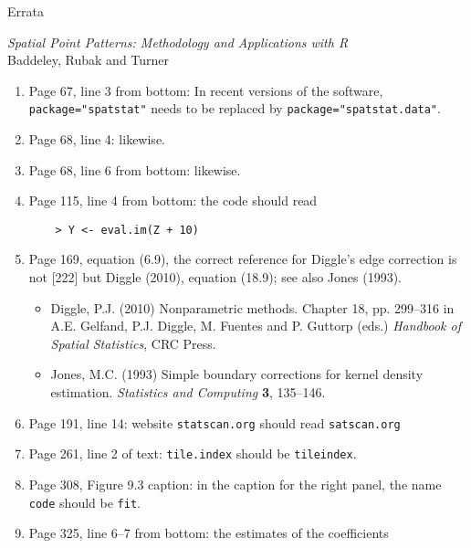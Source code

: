 \documentclass[12pt,a4paper]{article}
\begin{document}
\thispagestyle{empty}
\begin{center}
  \begin{LARGE}
    Errata 
  \end{LARGE}

  \begin{large}
    \emph{Spatial Point Patterns: Methodology and Applications with R}\\
    Baddeley, Rubak and Turner
  \end{large}
\end{center}

\begin{enumerate}
\item Page 67, line 3 from bottom: In recent versions of the software,
  \texttt{package="spatstat"} needs to be replaced by
  \texttt{package="spatstat.data"}.
\item Page 68, line 4: likewise.
\item Page 68, line 6 from bottom: likewise.
\item Page 115, line 4 from bottom: the code should read
\begin{verbatim}
    > Y <- eval.im(Z + 10)
\end{verbatim}
\item Page 169, equation (6.9), the correct reference for Diggle's
edge correction is not [222] %
but Diggle (2010), equation (18.9); see also Jones (1993).
\begin{small}
  \begin{itemize}
  \item
    Diggle, P.J. (2010)
    Nonparametric methods.
    Chapter 18, pp. 299--316 in
    A.E. Gelfand, P.J. Diggle, M. Fuentes and P. Guttorp (eds.)
    \emph{Handbook of Spatial Statistics}, CRC Press.
  \item  Jones, M.C. (1993)
    Simple boundary corrections for kernel density estimation.
    \emph{Statistics and Computing} \textbf{3}, 135--146.
  \end{itemize}
\end{small}
\item Page 191, line 14: 
 website \texttt{statscan.org} should read \texttt{satscan.org}
\item Page 261, line 2 of text: 
\texttt{tile.index} should be \texttt{tileindex}.
\item Page 308, Figure 9.3 caption: in the caption for the right panel,
the name \texttt{code} should be \texttt{fit}.
\item Page 325, line 6--7 from bottom: the estimates of the coefficients

\end{enumerate}
\end{document}

